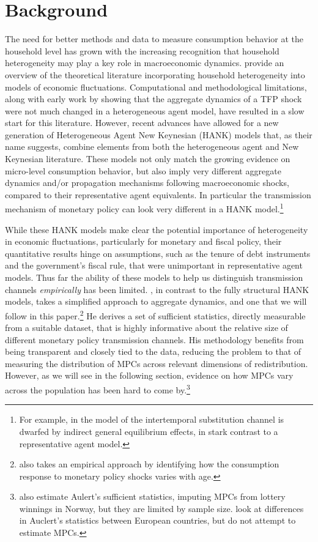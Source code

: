 \documentclass[titlepage]{\econtex}\newcommand{\texname}{ConsumptionHeterogeneity}
\begin{document}
\section{Background}
The need for better methods and data to measure consumption behavior at the household level has grown with the increasing recognition that household heterogeneity may play a key role in macroeconomic dynamics. \cite{kaplan_microeconomic_2018} provide an overview of the theoretical literature incorporating household heterogeneity into models of economic fluctuations. Computational and methodological limitations, along with early work by \cite{krusell_income_1998} showing that the aggregate dynamics of a TFP shock were not much changed in a heterogeneous agent model, have resulted in a slow start for this literature. However, recent advances have allowed for a new generation of Heterogeneous Agent New Keynesian (HANK) models that, as their name suggests, combine elements from both the heterogeneous agent and New Keynesian literature. These models not only match the growing evidence on micro-level consumption behavior, but also imply very different aggregate dynamics and/or propagation mechanisms following macroeconomic shocks, compared to their representative agent equivalents. In particular the transmission mechanism of monetary policy can look very different in a HANK model.\footnote{For example, in the model of \cite{kaplan_monetary_2016} the intertemporal substitution channel is dwarfed by indirect general equilibrium effects, in stark contrast to a representative agent model.}

While these HANK models make clear the potential importance of heterogeneity in economic fluctuations, particularly for monetary and fiscal policy, their quantitative results hinge on assumptions, such as the tenure of debt instruments and the government's fiscal rule, that were unimportant in representative agent models. Thus far the ability of these models to help us distinguish transmission channels \textit{empirically} has been limited. \cite{auclert_monetary_2017}, in contrast to the fully structural HANK models, takes a simplified approach to aggregate dynamics, and one that we will follow in this paper.\footnote{\cite{wong_population_2016} also takes an empirical approach by identifying how the consumption response to monetary policy shocks varies with age.} He derives a set of sufficient statistics, directly measurable from a suitable dataset, that is highly informative about the  relative size of different monetary policy transmission channels. His methodology benefits from being transparent and closely tied to the data, reducing the problem to that of measuring the distribution of MPCs across relevant dimensions of redistribution. However, as we will see in the following section, evidence on how MPCs vary across the population has been hard to come by.\footnote{\cite{fagereng_mpc_2016} also estimate Aulert's sufficient statistics, imputing MPCs from lottery winnings in Norway, but they are limited by sample size. \cite{ampudia_monetary_2018} look at differences in Auclert's statistics between European countries, but do not attempt to estimate MPCs.} 
\end{document}
